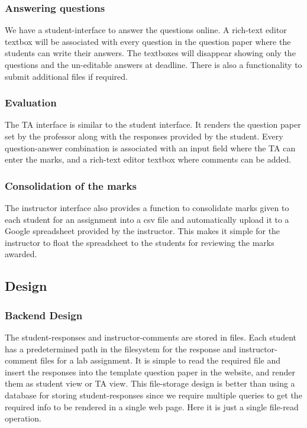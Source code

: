 \subsubsection{Answering questions}
We have a student-interface to answer the questions online. A rich-text editor textbox will be associated with every question in the question paper where the students can write their answers. The textboxes will disappear showing only the questions and the un-editable answers at deadline. There is also a functionality to submit additional files if required.

\subsubsection{Evaluation}
The TA interface is similar to the student interface. It renders the question paper set by the professor along with the responses provided by the student. Every question-answer combination is associated with an input field where the TA can enter the marks, and a rich-text editor textbox where comments can be added.

\subsubsection{Consolidation of the marks}
The instructor interface also provides a function to consolidate marks given to each student for an assignment into a csv file and  automatically upload it to a Google spreadsheet provided by the instructor. This makes it simple for the instructor to float the spreadsheet to the students for reviewing the marks awarded.


\subsection{Design}
\subsubsection{Backend Design}
The student-responses and instructor-comments are stored in files. Each student has a predetermined path in the filesystem for the response and instructor-comment files for a lab assignment. It is simple to read the required file and insert the responses into the template question paper in the website, and render them as student view or TA view. This file-storage design is better than using a database for storing student-responses since we require multiple queries to get the required info to be rendered in a single web page. Here it is just a single file-read operation.

